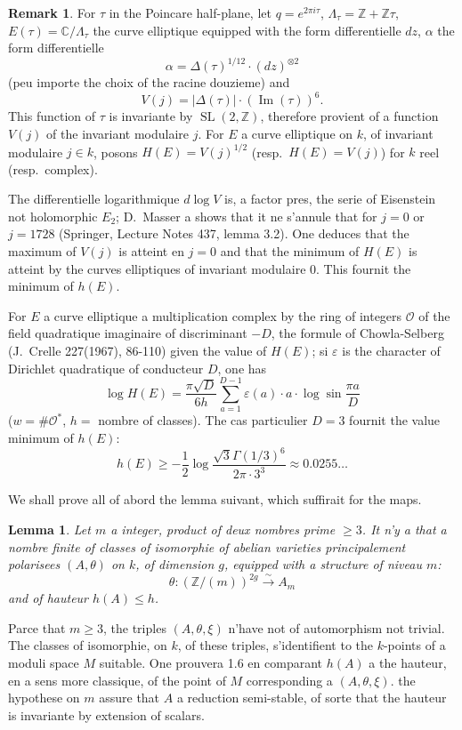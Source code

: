 \documentclass[12pt,a4paper]{article}
\theoremstyle{plain}
\newtheorem{lemma}[theorem]{Lemma}
\theoremstyle{definition}
\newtheorem{remark}[theorem]{Remark}
\theoremstyle{remark}
\DeclareMathOperator{\Impartie}{Im}
\newcommand{\CC}{\mathbb{C}}
\newcommand{\ZZ}{\mathbb{Z}}
\newcommand{\cO}{\mathcal{O}}
\providecommand{\CC}{\mathbb{C}}
\providecommand{\ZZ}{\mathbb{Z}}
\providecommand{\cO}{\mathcal{O}}
\providecommand{\SL}{\operatorname{SL}}
\begin{document}
\begin{remark}
For $\tau$ in the Poincare half-plane, let $q = e^{2\pi i \tau}$, $\Lambda_\tau = \ZZ + \ZZ\tau$, $E(\tau) = \CC/\Lambda_\tau$ the curve elliptique equipped with the form differentielle $dz$, $\alpha$ the form differentielle
\[
\alpha = \Delta(\tau)^{1/12} \cdot (dz)^{\otimes 2}
\]
(peu importe the choix of the racine douzieme) and
\[
V(j) = |\Delta(\tau)| \cdot (\Impartie(\tau))^6.
\]
This function of $\tau$ is invariante by $\SL(2,\ZZ)$, therefore provient of a function $V(j)$ of the invariant modulaire $j$. For $E$ a curve elliptique on $k$, of invariant modulaire $j \in k$, posons $H(E) = V(j)^{1/2}$ (resp.\ $H(E) = V(j)$) for $k$ reel (resp.\ complex).

The differentielle logarithmique $d\log V$ is, a factor pres, the serie of Eisenstein not holomorphic $E_2$; D.~Masser a shows that it ne s'annule that for $j = 0$ or $j = 1728$ (Springer, Lecture Notes 437, lemma 3.2). One deduces that the maximum of $V(j)$ is atteint en $j = 0$ and that the minimum of $H(E)$ is atteint by the curves elliptiques of invariant modulaire $0$. This fournit the minimum of $h(E)$.

For $E$ a curve elliptique a multiplication complex by the ring of integers $\cO$ of the field quadratique imaginaire of discriminant $-D$, the formule of Chowla-Selberg (J.~Crelle 227(1967), 86-110) given the value of $H(E)$; si $\varepsilon$ is the character of Dirichlet quadratique of conducteur $D$, one has
\[
\log H(E) = \frac{\pi \sqrt{D}}{6h} \sum_{a=1}^{D-1} \varepsilon(a) \cdot a \cdot \log \sin\frac{\pi a}{D}
\]
($w = \#\cO^*$, $h =$ nombre of classes). The cas particulier $D = 3$ fournit the value minimum of $h(E)$:
\[
h(E) \geq -\frac{1}{2} \log\frac{\sqrt{3}\Gamma(1/3)^6}{2\pi \cdot 3^3} \approx 0.0255\ldots
\]
\end{remark}

We shall prove all of abord the lemma suivant, which suffirait for the maps.

\begin{lemma}
Let $m$ a integer, product of deux nombres prime $\geq 3$. It n'y a that a nombre finite of classes of isomorphie of abelian varieties principalement polarisees $(A,\theta)$ on $k$, of dimension $g$, equipped with a structure of niveau $m$:
\[
\theta : (\ZZ/(m))^{2g} \xrightarrow{\sim} A_m
\]
and of hauteur $h(A) \leq h$.
\end{lemma}

Parce that $m \geq 3$, the triples $(A,\theta,\xi)$ n'have not of automorphism not trivial. The classes of isomorphie, on $k$, of these triples, s'identifient to the $k$-points of a moduli space $M$ suitable. One prouvera 1.6 en comparant $h(A)$ a the hauteur, en a sens more classique, of the point of $M$ corresponding a $(A,\theta,\xi)$. the hypothese on $m$ assure that $A$ a reduction semi-stable, of sorte that the hauteur is invariante by extension of scalars.
\end{document}
